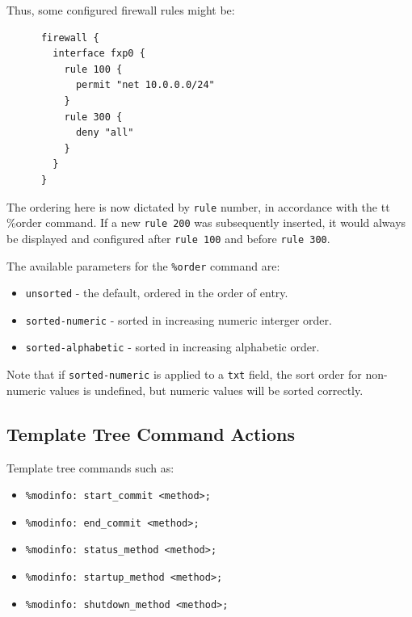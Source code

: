 \documentclass[11pt]{article}
\begin{document}
\noindent Thus, some configured firewall rules might be:

\begin{verbatim}
      firewall {
        interface fxp0 {
          rule 100 {
            permit "net 10.0.0.0/24"
          }
          rule 300 {
            deny "all"
          }
        }
      }
\end{verbatim}

\noindent The ordering here is now dictated by {\tt rule} number, in accordance
with the {tt \%order} command.  If a new {\tt rule 200} was
subsequently inserted, it would always be displayed and configured
after {\tt rule 100} and before {\tt rule 300}.

\noindent The available parameters for the {\tt \%order} command are:

\begin{itemize}

  \item {\tt unsorted} - the default, ordered in the order of entry.

  \item {\tt sorted-numeric} - sorted in increasing numeric interger
  order.

  \item {\tt sorted-alphabetic} - sorted in increasing alphabetic order.

\end{itemize}

\noindent Note that if {\tt sorted-numeric} is applied to a {\tt txt}
field, the sort order for non-numeric values is undefined, but numeric
values will be sorted correctly.

\subsection{Template Tree Command Actions}

Template tree commands such as:
\begin{itemize}

  \item {\tt \%modinfo: start\_commit <method>;} 

  \item {\tt \%modinfo: end\_commit <method>;}

  \item {\tt \%modinfo: status\_method <method>;}

  \item {\tt \%modinfo: startup\_method <method>;}

  \item {\tt \%modinfo: shutdown\_method <method>;}

\end{itemize}
\end{document}
